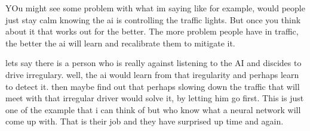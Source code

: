 YOu might see some problem with what im saying like for example, would people just stay calm knowing the ai is controlling the traffic lights. But once you think about it that works out for the better. The more problem people have in traffic, the better the ai will learn and recalibrate them to mitigate it.

lets say there is a person who is really against listening to the AI and discides to drive irregulary. well, the ai would learn from that iregularity and perhaps learn to detect it. then maybe find out that perhaps slowing down the traffic that will meet with that irregular driver would solve it, by letting him go first. This is just one of the example that i can think of but who know what a neural network will come up with. That is their job and they have surprised up time and again.